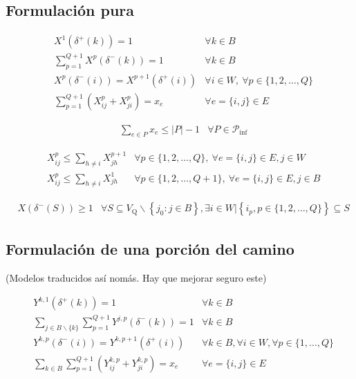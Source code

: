 \documentclass[10pt, a4paper]{article}
\theoremstyle{definition}
\begin{document}
\subsection{Formulación pura}

\begin{align}
	& X^{1}\left(\delta^{+}(k)\right)=1 & \forall k \in B \label{eq:14} \\
	& \sum_{p=1}^{Q+1} X^{p}\left(\delta^{-}(k)\right)=1 & \forall k \in B \label{eq:15} \\
	& X^{p}\left(\delta^{-}(i)\right)=X^{p+1}\left(\delta^{+}(i)\right) & \forall i \in W,\ \forall p \in\{1,2, \ldots, Q\} \label{eq:16} \\
	& \sum_{p=1}^{Q+1}\left(X_{i j}^{p}+X_{j i}^{p}\right)=x_{e} & \forall e=\{i, j\} \in E \label{eq:17}
\end{align}

\begin{align}
	& \sum_{e \in P} x_{e} \leq|P|-1 & \forall P \in \mathcal{P}_{\mathrm{inf}} \label{eq:18}
\end{align}

\begin{align}
	& X_{i j}^{p} \leq \sum_{h \neq i} X_{j h}^{p+1} & \forall p \in\{1,2, \ldots, Q\},\ \forall e=\{i, j\} \in E, j \in W \label{eq:19} \\
	& X_{i j}^{p} \leq \sum_{h \neq i} X_{j h}^{1} & \forall p \in\{1,2, \ldots, Q+1\},\ \forall e=\{i, j\} \in E, j \in B \label{eq:20}
\end{align}

\begin{align}
	& X\left(\delta^{-}(S)\right) \geq 1 & \forall S \subseteq V_{\mathrm{Q}} \backslash\left\{j_{0} : j \in B\right\}, \exists i \in W |\left\{i_{p}, p \in\{1,2, \ldots, Q\}\right\} \subseteq S \label{eq:21}
\end{align}

\subsection{Formulación de una porción del camino}

(Modelos traducidos así nomás. Hay que mejorar seguro este)

\begin{align}
	& Y^{k, 1}\left(\delta^{+}(k)\right)=1 & \forall k \in B \label{eq:22} \\
	& \sum_{j \in B \backslash\{k\}} \sum_{p=1}^{Q+1} Y^{j, p}\left(\delta^{-}(k)\right)=1 & \forall k \in B \label{eq:23} \\
	& Y^{k, p}\left(\delta^{-}(i)\right)=Y^{k, p+1}\left(\delta^{+}(i)\right) & \forall k \in B, \forall i \in W, \forall p \in\{1, \ldots, Q\} \label{eq:24} \\
	& \sum_{k \in B} \sum_{p=1}^{Q+1}\left(Y_{i j}^{k, p}+Y_{j i}^{k, p}\right)=x_{e} & \forall e=\{i, j\} \in E \label{eq:25}
\end{align}
\end{document}
